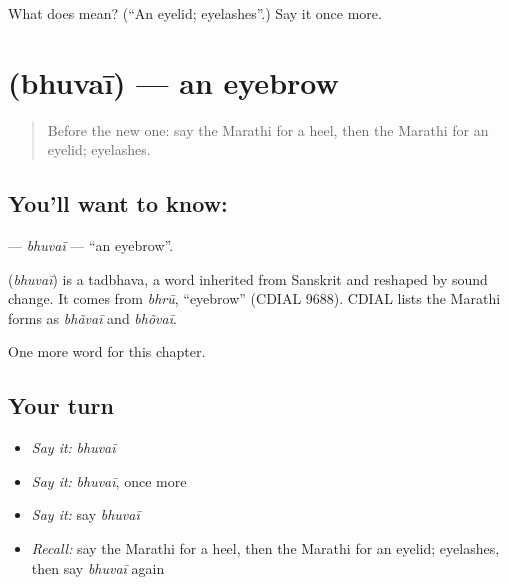 \begin{tcolorbox}[breakable,colback=teal!4,colframe=teal!35!black,title={Before you move on}]
What does  mean? (\textquotedblleft{}An eyelid; eyelashes\textquotedblright{}.) Say it once more.
\end{tcolorbox}
\section[\texorpdfstring{\mr{भुवई} (bhuvaī)}{भुवई (bhuvaī)}]{ (bhuvaī) — an eyebrow}

\label{lesson:MR-C220-bhuvai}



\begin{quote}
Before the new one: say the Marathi for a heel, then the Marathi for an eyelid; eyelashes.
\end{quote}

\subsection*{You'll want to know: }
\textbf{} — \emph{bhuvaī} — \textquotedblleft{}an eyebrow\textquotedblright{}.

\begin{cousinweb}
\textbf{} (\emph{bhuvaī}) is a tadbhava, a word inherited from Sanskrit and reshaped by sound change. It comes from \emph{bhrū}, \textquotedblleft{}eyebrow\textquotedblright{} (CDIAL 9688). CDIAL lists the Marathi forms as \emph{bhãvaī} and \emph{bhõvaī}.
\end{cousinweb}

\begin{grammarlens}[title={What you've built}]
One more word for this chapter.
\end{grammarlens}

\subsection*{Your turn}
\begin{itemize}
\raggedright
  \item \emph{Say it:} \emph{bhuvaī}
  \item \emph{Say it:} \emph{bhuvaī}, once more
  \item \emph{Say it:} say \emph{bhuvaī}
  \item \emph{Recall:} say the Marathi for a heel, then the Marathi for an eyelid; eyelashes, then say \emph{bhuvaī} again
\end{itemize}


